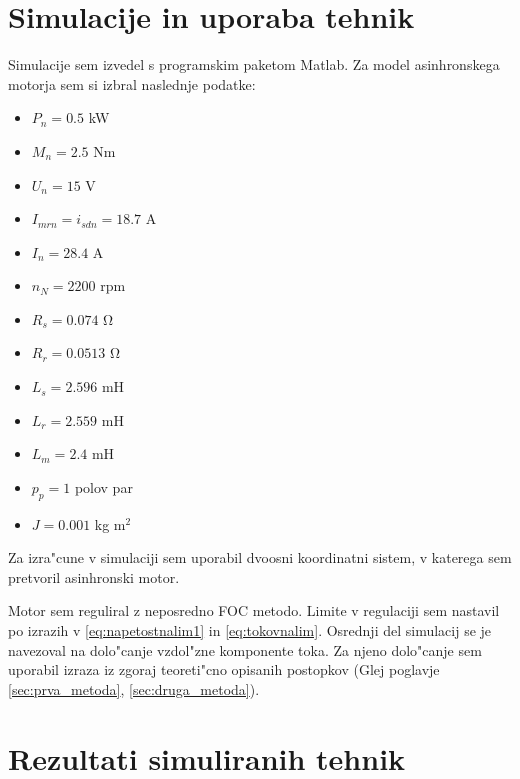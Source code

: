 \documentclass[journal,a4paper,twoside]{sty/IEEEtran}
\begin{document}
\section{Simulacije in uporaba tehnik}
Simulacije sem izvedel s programskim paketom Matlab. 
Za model asinhronskega motorja sem si izbral naslednje podatke:
\begin{itemize}
\item{$P_n=0.5$ kW}
\item{$M_n = 2.5$ Nm}
\item{$U_n = 15$ V}	
\item{$I_{mrn}= i_{sdn} = 18.7$ A}
\item{$I_n = 28.4$ A}
\item{$n_N = 2200$ rpm}
\item{$R_s = 0.074$ $\mathrm{\Omega}$}
\item{$R_r = 0.0513$ $\mathrm{\Omega}$}
\item{$L_s = 2.596$ mH}
\item{$L_r = 2.559$ mH}
\item{$L_m = 2.4$ mH}
\item{$p_p = 1$  polov par}
\item{$J = 0.001$ kg $\mathrm{m}^2$}
\end{itemize}

Za izra"cune v simulaciji sem uporabil dvoosni koordinatni sistem, v katerega sem pretvoril asinhronski motor.




Motor sem reguliral z neposredno FOC metodo. Limite v regulaciji sem nastavil po izrazih v \ref{eq:napetostnalim1} in \ref{eq:tokovnalim}.
Osrednji del simulacij se je navezoval na dolo"canje vzdol"zne komponente toka. Za njeno dolo"canje sem uporabil izraza iz zgoraj teoreti"cno opisanih postopkov (Glej poglavje \ref{sec:prva_metoda}, \ref{sec:druga_metoda}).

\section{Rezultati simuliranih tehnik}
\end{document}
